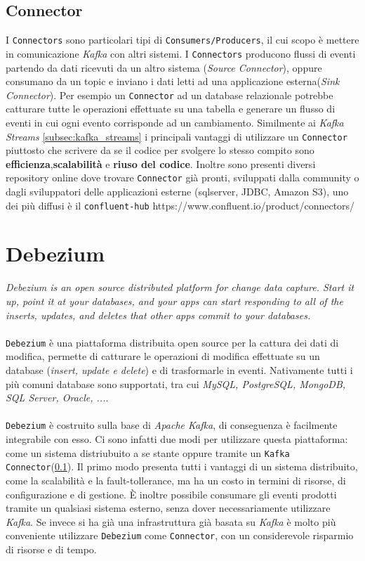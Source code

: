 \subsection{Connector}
\label{subsec:kafka_connectors}
I \texttt{Connectors} sono particolari tipi di \texttt{Consumers/Producers}, il cui scopo è mettere in comunicazione \textit{Kafka} con altri sistemi.
I \texttt{Connectors} producono flussi di eventi partendo da dati ricevuti da un altro sistema (\textit{Source Connector}), oppure consumano da un topic e inviano i dati letti ad una applicazione esterna(\textit{Sink Connector}).
Per esempio un \texttt{Connector} ad un database relazionale potrebbe catturare tutte le operazioni effettuate su una tabella e generare un flusso di eventi in cui ogni evento corrisponde ad un cambiamento.
Similmente ai \textit{Kafka Streams} \ref{subsec:kafka_streams} i principali vantaggi di utilizzare un \texttt{Connector} piuttosto che scrivere da se il codice per svolgere lo stesso compito sono
\textbf{efficienza},\textbf{scalabilità} e \textbf{riuso del codice}.
Inoltre sono presenti diversi repository online dove trovare \texttt{Connector} già pronti, sviluppati dalla community o dagli sviluppatori delle applicazioni esterne (sqlserver, JDBC, Amazon S3),
uno dei più diffusi è il \texttt{confluent-hub} https://www.confluent.io/product/connectors/ 

\section{Debezium}
\label{sec:debezium_overview}
\textit{Debezium is an open source distributed platform for change data capture. Start it up, point it at your databases, and your apps can start responding to all of the inserts, updates, and deletes that other apps commit to your databases.}\cite*{debeziumwebsite}\\\\
\texttt{Debezium} è una piattaforma distribuita open source per la cattura dei dati di modifica, permette di catturare le operazioni di modifica effettuate su un database (\textit{insert, update e delete}) e di trasformarle in eventi.
Nativamente tutti i più comuni database sono supportati, tra cui \textit{MySQL, PostgreSQL, MongoDB, SQL Server, Oracle, ...}.\\\\
\texttt{Debezium} è costruito sulla base di \textit{Apache Kafka}, di conseguenza è facilmente integrabile con esso.
Ci sono infatti due modi per utilizzare questa piattaforma: come un sistema distriubuito a se stante oppure tramite un \texttt{Kafka Connector}(\ref{subsec:kafka_connectors}).
Il primo modo presenta tutti i vantaggi di un sistema distribuito, come la scalabilità e la fault-tollerance, ma ha un costo in termini di risorse, di configurazione e di gestione.
È inoltre possibile consumare gli eventi prodotti tramite un qualsiasi sistema esterno, senza dover necessariamente utilizzare \textit{Kafka}.
Se invece si ha già una infrastruttura già basata su \textit{Kafka} è molto più conveniente utilizzare \texttt{Debezium} come \texttt{Connector}, con un considerevole risparmio di risorse e di tempo.  


